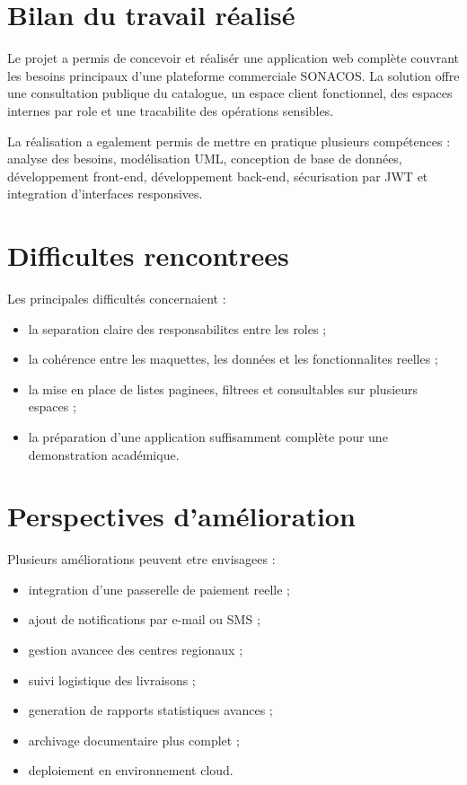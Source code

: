 \documentclass[12pt,a4paper]{report}
\begin{document}
\section{Bilan du travail réalisé}

Le projet a permis de concevoir et réalisér une application web complète couvrant les besoins principaux d'une plateforme commerciale SONACOS. La solution offre une consultation publique du catalogue, un espace client fonctionnel, des espaces internes par role et une tracabilite des opérations sensibles.

La réalisation a egalement permis de mettre en pratique plusieurs compétences : analyse des besoins, modélisation UML, conception de base de données, développement front-end, développement back-end, sécurisation par JWT et integration d'interfaces responsives.

\section{Difficultes rencontrees}

Les principales difficultés concernaient :

\begin{itemize}
  \item la separation claire des responsabilites entre les roles ;
  \item la cohérence entre les maquettes, les données et les fonctionnalites reelles ;
  \item la mise en place de listes paginees, filtrees et consultables sur plusieurs espaces ;
  \item la préparation d'une application suffisamment complète pour une demonstration académique.
\end{itemize}

\section{Perspectives d'amélioration}

Plusieurs améliorations peuvent etre envisagees :

\begin{itemize}
  \item integration d'une passerelle de paiement reelle ;
  \item ajout de notifications par e-mail ou SMS ;
  \item gestion avancee des centres regionaux ;
  \item suivi logistique des livraisons ;
  \item generation de rapports statistiques avances ;
  \item archivage documentaire plus complet ;
  \item deploiement en environnement cloud.
\end{itemize}
\end{document}
